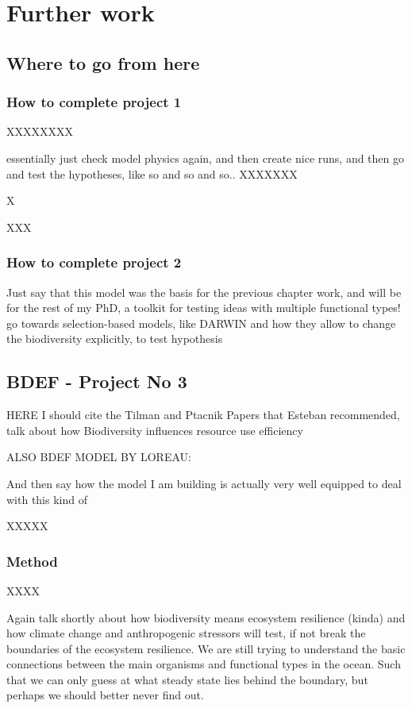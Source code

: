 \chapter {Further work}

\section{Where to go from here}

\subsection{How to complete project 1}

XXXXXXXX

essentially just check model physics again, and then
create nice runs, and then go and test the hypotheses, like so and so and so..
XXXXXXX

X

XXX


\subsection{How to complete project 2}


Just say that this model was the basis for the previous chapter work, and will be for the rest of my PhD, a toolkit for testing ideas with multiple functional types! go towards selection-based models, like DARWIN
and how they allow to change the biodiversity explicitly, to test hypothesis




\section{BDEF - Project No 3}

 HERE I should cite the Tilman and Ptacnik Papers that Esteban recommended, talk about how Biodiversity influences resource use efficiency
 
ALSO BDEF MODEL BY LOREAU: \citep{Loreau1998b}
 
 And then say how the model I am building is actually very well equipped to deal with this kind of 


XXXXX

\subsection{Method}
XXXX




Again talk shortly about how biodiversity means ecosystem resilience (kinda) and how climate change and anthropogenic stressors will test, if not break the boundaries of the ecosystem resilience. We are still trying to understand the basic connections between the main organisms and functional types in the ocean. Such that we can only guess at what steady state lies behind the boundary, but perhaps we should better never find out.

